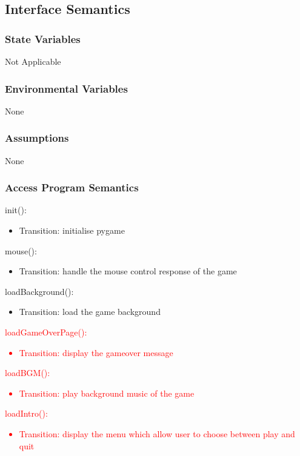 \documentclass[12,english]{article}
\begin{document}
\subsection{Interface Semantics}
\subsubsection{State Variables}
Not Applicable 
\subsubsection{Environmental Variables}
None
\subsubsection{Assumptions}
None
\subsubsection{Access Program Semantics}

\noindent init():
\begin{itemize}
    \item Transition: initialise pygame
\end{itemize}

\noindent mouse():
\begin{itemize}
    \item Transition: handle the mouse control response of the game
\end{itemize}

\noindent loadBackground():
\begin{itemize}
    \item Transition: load the game background
\end{itemize}

\noindent \textcolor{red}{loadGameOverPage():}
\textcolor{red}{\begin{itemize}
    \item Transition: display the gameover message
\end{itemize}}

\noindent \textcolor{red}{loadBGM():}
\textcolor{red}{\begin{itemize}
    \item Transition: play background music of the game
\end{itemize}}

\noindent \textcolor{red}{loadIntro():}
\textcolor{red}{\begin{itemize}
    \item Transition: display the menu which allow user to choose between play and quit
\end{itemize}}
\end{document}
